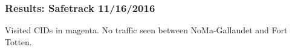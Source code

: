 \documentclass[t]{beamer}
\begin{document}
\begin{frame}
\frametitle{Results: Safetrack 11/16/2016}

Visited CIDs in magenta.  No traffic seen
between NoMa-Gallaudet and Fort Totten.

\captionsetup[subfigure]{labelformat=empty}
\begin{figure}[!tbp]
  \centering
  \hspace{0.75in}


\end{figure}
\end{frame}
\end{document}
